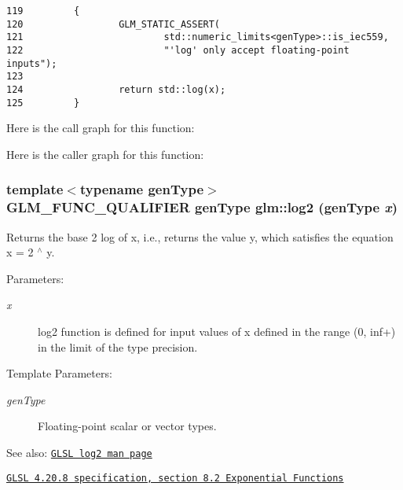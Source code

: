 \begin{Code}\begin{verbatim}119         {
120                 GLM_STATIC_ASSERT(
121                         std::numeric_limits<genType>::is_iec559,
122                         "'log' only accept floating-point inputs");
123 
124                 return std::log(x);
125         }
\end{verbatim}
\end{Code}




Here is the call graph for this function:

Here is the caller graph for this function:\hypertarget{group__core__func__exponential_g501534b7328bab23128aa15b316e483d}{
\subsubsection[log2]{\setlength{\rightskip}{0pt plus 5cm}template$<$typename genType$>$ GLM\_\-FUNC\_\-QUALIFIER genType glm::log2 (genType {\em x})}}
\label{group__core__func__exponential_g501534b7328bab23128aa15b316e483d}


Returns the base 2 log of x, i.e., returns the value y, which satisfies the equation x = 2 $^\wedge$ y.

\begin{Desc}
\item[Parameters:]
\begin{description}
\item[{\em x}]log2 function is defined for input values of x defined in the range (0, inf+) in the limit of the type precision. \end{description}
\end{Desc}
\begin{Desc}
\item[Template Parameters:]
\begin{description}
\item[{\em genType}]Floating-point scalar or vector types.\end{description}
\end{Desc}
\begin{Desc}
\item[See also:]\href{http://www.opengl.org/sdk/docs/manglsl/xhtml/log2.xml}{\tt GLSL log2 man page} 

\href{http://www.opengl.org/registry/doc/GLSLangSpec.4.20.8.pdf}{\tt GLSL 4.20.8 specification, section 8.2 Exponential Functions} \end{Desc}


